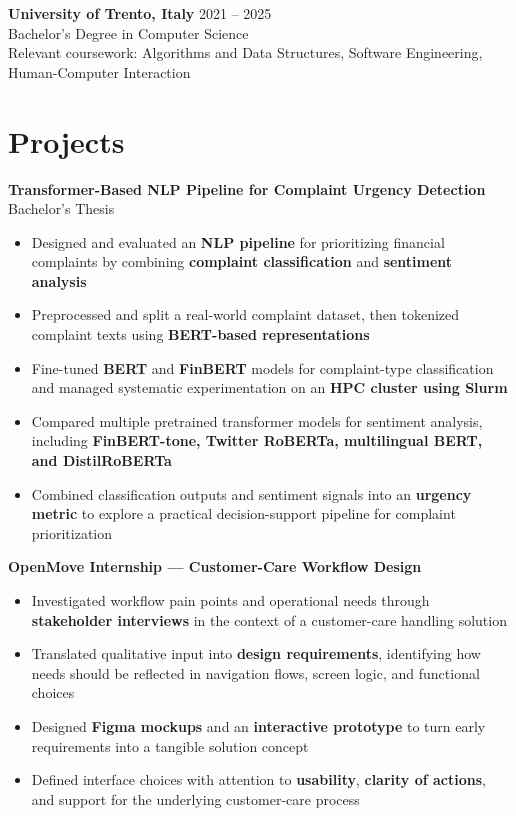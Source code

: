 \documentclass[11pt]{article}
\begin{document}
\vspace{8pt}

\textbf{University of Trento, Italy} \hfill {\color{textgray}2021 -- 2025} \\[-1pt]
Bachelor's Degree in Computer Science \\[4pt]
{\color{textgray}Relevant coursework: Algorithms and Data Structures, Software Engineering, Human-Computer Interaction}


\section*{Projects}

\textbf{Transformer-Based NLP Pipeline for Complaint Urgency Detection} \hfill {\color{textgray}Bachelor’s Thesis} \\[-0.8em]
\begin{itemize}
\item Designed and evaluated an \textbf{NLP pipeline} for prioritizing financial complaints by combining \textbf{complaint classification} and \textbf{sentiment analysis}
\item Preprocessed and split a real-world complaint dataset, then tokenized complaint texts using \textbf{BERT-based representations}
\item Fine-tuned \textbf{BERT} and \textbf{FinBERT} models for complaint-type classification and managed systematic experimentation on an \textbf{HPC cluster using Slurm}
\item Compared multiple pretrained transformer models for sentiment analysis, including \textbf{FinBERT-tone, Twitter RoBERTa, multilingual BERT, and DistilRoBERTa}
\item Combined classification outputs and sentiment signals into an \textbf{urgency metric} to explore a practical decision-support pipeline for complaint prioritization
\end{itemize}

\vspace{4pt}

\textbf{OpenMove Internship --- Customer-Care Workflow Design} \\[-0.8em]
\begin{itemize}
\item Investigated workflow pain points and operational needs through \textbf{stakeholder interviews} in the context of a customer-care handling solution
\item Translated qualitative input into \textbf{design requirements}, identifying how needs should be reflected in navigation flows, screen logic, and functional choices
\item Designed \textbf{Figma mockups} and an \textbf{interactive prototype} to turn early requirements into a tangible solution concept
\item Defined interface choices with attention to \textbf{usability}, \textbf{clarity of actions}, and support for the underlying customer-care process
\end{itemize}
\end{document}
